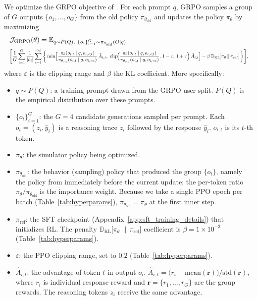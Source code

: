 \documentclass{article} %
\begin{document}
We optimize the GRPO objective of \citet{shao2024deepseekmath}. For each prompt $q$, GRPO samples a group of $G$ outputs $\{o_1,\dots,o_G\}$ from the old policy $\pi_{\theta_{\mathrm{old}}}$ and updates the policy $\pi_\theta$ by maximizing
\begin{equation*}
\begin{aligned}
&\mathcal{J}_{\mathrm{GRPO}}(\theta) = \mathbb{E}_{q \sim P(Q),\ \{o_i\}_{i=1}^{G} \sim \pi_{\theta_{\mathrm{old}}}(O \mid q)} \\
&\resizebox{\linewidth}{!}{$\Bigg[ \displaystyle \frac{1}{G}\sum_{i=1}^{G}\frac{1}{|o_i|}\sum_{t=1}^{|o_i|}\bigg\{ \min\!\Big[ \frac{\pi_\theta(o_{i,t}\mid q,o_{i,<t})}{\pi_{\theta_{\mathrm{old}}}(o_{i,t}\mid q,o_{i,<t})}\,\hat{A}_{i,t},\ \mathrm{clip}\!\Big(\frac{\pi_\theta(o_{i,t}\mid q,o_{i,<t})}{\pi_{\theta_{\mathrm{old}}}(o_{i,t}\mid q,o_{i,<t})},\, 1-\varepsilon,\, 1+\varepsilon\Big)\,\hat{A}_{i,t} \Big] - \beta\, \mathbb{D}_{\mathrm{KL}}\!\big[\pi_\theta \,\|\, \pi_{\mathrm{ref}}\big] \bigg\}\Bigg] ,$}
\end{aligned}
\end{equation*}
where $\varepsilon$ is the clipping range and $\beta$ the KL coefficient. More specifically:
\begin{itemize}
\item $q \sim P(Q)$: a training prompt drawn from the GRPO user split. $P(Q)$ is the empirical distribution over these prompts.
\item $\{o_i\}_{i=1}^{G}$: the $G=4$ candidate generations sampled per prompt. Each $o_i = (z_i, \hat{y}_i)$ is a reasoning trace $z_i$ followed by the response $\hat{y}_i$. $o_{i,t}$ is its $t$-th token.
\item $\pi_\theta$: the simulator policy being optimized.
\item $\pi_{\theta_{\mathrm{old}}}$: the behavior (sampling) policy that produced the group $\{o_i\}$, namely the policy from immediately before the current update; the per-token ratio $\pi_\theta/\pi_{\theta_{\mathrm{old}}}$ is the importance weight. Because we take a single PPO epoch per batch (Table~\ref{tab:hyperparams}), $\pi_{\theta_{\mathrm{old}}}=\pi_\theta$ at the first inner step.
\item $\pi_{\mathrm{ref}}$: the SFT checkpoint (Appendix~\ref{app:sft_training_details}) that initializes RL. The penalty $\mathbb{D}_{\mathrm{KL}}\!\big[\pi_\theta \,\|\, \pi_{\mathrm{ref}}\big]$ coefficient is $\beta=1\times10^{-3}$ (Table~\ref{tab:hyperparams}).
\item $\varepsilon$: the PPO clipping range, set to $0.2$ (Table~\ref{tab:hyperparams}).
\item $\hat{A}_{i,t}$: the advantage of token $t$ in output $o_i$. $\hat{A}_{i,t}=\big(r_i-\mathrm{mean}(\mathbf{r})\big)/\mathrm{std}(\mathbf{r})$, where $r_i$ is individual response reward and $\mathbf{r}=\{r_1,\dots,r_G\}$ are the group rewards. The reasoning tokens $z_i$ receive the same advantage.
\end{itemize}
\end{document}
